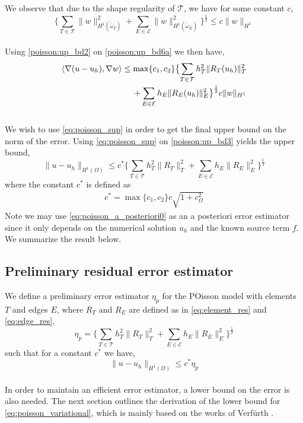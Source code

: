 \\
\\
We observe that due to the shape regularity of $\mathcal{T}$, we have for some constant $c$, 
\begin{equation} \label{poisson:up_bd2}
\bigl\{ \displaystyle\sum_{T \in \mathcal{T}} \|w\|^2_{H^1(\tilde{\omega}_T)} + \displaystyle\sum_{E \in \mathcal{E}} \|w\|^2_{H^1(\tilde{\omega}_E)} \bigr\}^\frac{1}{2} \leq c \| w\|_{H^1}
\end{equation}
\\
Using \eqref{poisson:up_bd2} on \eqref{poisson:up_bd6a} we then have, 
\begin{align} \label{poisson:up_bd3}
\langle \nabla(u-u_h), \nabla w \rangle \leq  \max\{c_1, c_2\}\bigl\{\sum_{T \in \mathcal{T}} h_T^2\| R_T(u_h)\|^2_T \\
+ \sum_{E \in \mathcal{E}} h_E\| R_E(u_h) \|^2_E \bigr\}^\frac{1}{2} c \| w\|_{H^1} \notag
\end{align}
\\
We wish to use \eqref{eq:poisson_sup} in order to get the final upper bound on the norm of the error. Using \eqref{eq:poisson_sup} on \eqref{poisson:up_bd3} yields the upper bound,
\begin{equation} \label{eq:poisson_a_posteriori0}
\| u - u_h \|_{H^1(\Omega)} \leq c^* \bigl\{ \displaystyle\sum_{T \in \mathcal{T}} h_T^2\| R_T\|^2_T + \displaystyle\sum_{E \in \mathcal{E}} h_E\| R_E \|^2_E \bigr\}^\frac{1}{2}
\end{equation}
where the constant $c^*$ is defined as
\begin{align*}
c^* = \max \{c_1, c_2\} c \sqrt{1+c_\Omega^2}
\end{align*}
Note we may use \eqref{eq:poisson_a_posteriori0} as an a posteriori error estimator since it only depends on the numerical solution $u_h$ and the known source term $f$. We summarize the result below.
\subsection{Preliminary residual error estimator}
We define a preliminary error estimator $\eta_p$ for the POisson model with elements $T$ and edges $E$, where $R_T$ and $R_E$ are defined as in \eqref{eq:element_res} and \eqref{eq:edge_res},
\begin{equation} \label{eq:poisson_eta1}
\eta_p = \bigl\{ \displaystyle\sum_{T \in \mathcal{T}} h_T^2\| R_T\|^2_T + \displaystyle\sum_{E \in \mathcal{E}} h_E\| R_E \|^2_E \bigr\}^\frac{1}{2}
\end{equation}
such that for a constant $c^*$ we have,
\begin{equation} \label{eq:poisson_a_posteriori1}
\| u - u_h \|_{H^1(\Omega)} \leq c^* \eta_p
\end{equation}
\\
In order to maintain an efficient error estimator, a lower bound on the error is also needed. The next section outlines the derivation of the lower bound for \eqref{eq:poisson_variational}, which is mainly based on the works of Verfürth \cite{verfurth13, verfurth92}.
\\ 
